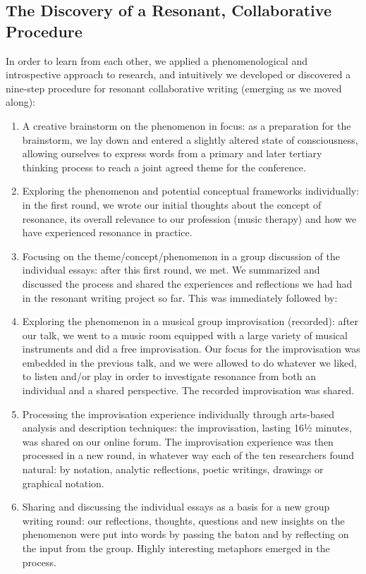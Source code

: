 \begin{adjmulticols}{2}{0mm}{0mm}
\section{The Discovery of a Resonant, Collaborative Procedure}
In order to learn from each other, we applied a phenomenological and introspective approach to research, and intuitively we developed or discovered a nine-step procedure for resonant collaborative writing (emerging as we moved along):
\begin{enumerate}
    \item A creative brainstorm on the phenomenon in focus: as a preparation for the brainstorm, we lay down and entered a slightly altered state of consciousness, allowing ourselves to express words from a primary and later tertiary thinking process to reach a joint agreed theme for the conference.
    \item Exploring the phenomenon and potential conceptual frameworks individually: in the first round, we wrote our initial thoughts about the concept of resonance, its overall relevance to our profession (music therapy) and how we have experienced resonance in practice.
    \item Focusing on the theme/concept/phenomenon in a group discussion of the individual essays: after this first round, we met. We summarized and discussed the process and shared the experiences and reflections we had had in the resonant writing project so far. This was immediately followed by:
    \item Exploring the phenomenon in a musical group improvisation (recorded): after our talk, we went to a music room equipped with a large variety of musical instruments and did a free improvisation. Our focus for the improvisation was embedded in the previous talk, and we were allowed to do whatever we liked, to listen and/or play in order to investigate resonance from both an individual and a shared perspective. The recorded improvisation was shared.
    \item Processing the improvisation experience individually through arts-based analysis and description techniques: the improvisation, lasting 16½ minutes, was shared on our online forum.%
    The improvisation experience was then processed in a new round, in whatever way each of the ten researchers found natural: by notation, analytic reflections, poetic writings, drawings or graphical notation.
    \item Sharing and discussing the individual essays as a basis for a new group writing round: our reflections, thoughts, questions and new insights on the phenomenon were put into words by passing the baton and by reflecting on the input from the group. Highly interesting metaphors emerged in the process.

\end{enumerate}
\end{adjmulticols}
